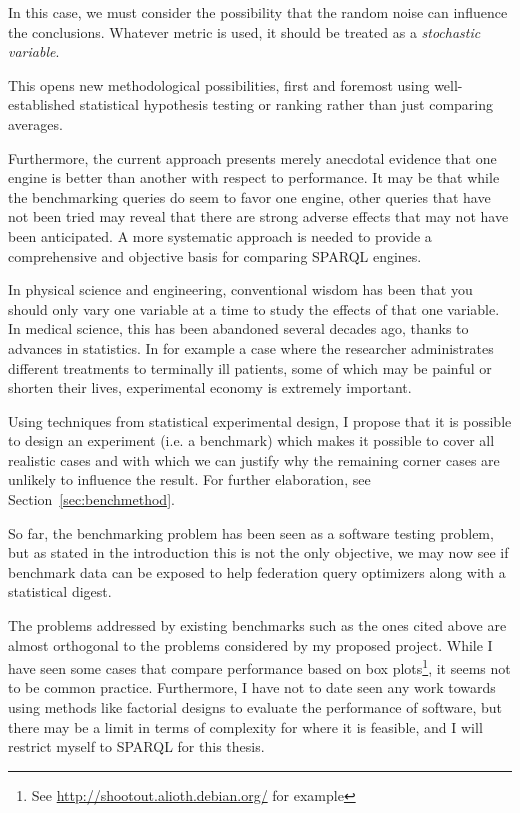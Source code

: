 \documentclass{llncs}
\begin{document}
In this case, we must consider the possibility that the random noise
can influence the conclusions. Whatever metric is used, it should be
treated as a \emph{stochastic variable}.

This opens new methodological possibilities, first and foremost
using well-established statistical hypothesis testing or ranking
rather than just comparing averages.

Furthermore, the current approach presents merely anecdotal evidence
that one engine is better than another with respect to
performance. It may be that while the benchmarking queries do seem to
favor one engine, other queries that have not been tried may reveal
that there are strong adverse effects that may not have been
anticipated. A more systematic approach is needed to provide a
comprehensive and objective basis for comparing SPARQL engines.


In physical science and engineering, conventional wisdom has been that
you should only vary one variable at a time to study the effects of
that one variable. In medical science, this has been abandoned several
decades ago, thanks to advances in statistics. In for example a case where
the researcher administrates different treatments to terminally ill
patients, some of which may be painful or shorten their lives,
experimental economy is extremely important.

Using techniques from statistical experimental design, I propose
that it is possible to design an experiment (i.e. a benchmark) which
makes it possible to cover all realistic cases and with which we can justify
why the remaining corner cases are unlikely to influence the
result. For further elaboration, see Section~\ref{sec:benchmethod}.

So far, the benchmarking problem has been seen as a software testing
problem, but as stated in the introduction this is not the only
objective, we may now see if benchmark data can be exposed to help
federation query optimizers along with a statistical digest.

The problems addressed by existing benchmarks such as the ones cited
above are almost orthogonal to the problems considered by my proposed
project. While I have seen some cases that compare performance based
on box plots\footnote{See \url{http://shootout.alioth.debian.org/} for
  example}, it seems not to be common practice. Furthermore, I have not to date seen
any work towards using methods like factorial designs to evaluate
the performance of software, but there may be a limit in terms of
complexity for where it is feasible, and I will restrict myself to
SPARQL for this thesis.
\end{document}
